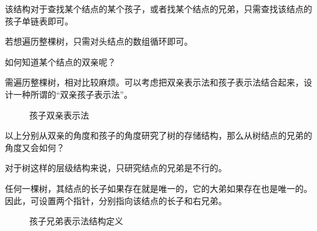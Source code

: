 \begin{frame}
\begin{figure}
\centering

\end{figure}
\end{frame}
%
\begin{frame}

\end{frame}
%
\begin{frame}
该结构对于查找某个结点的某个孩子，或者找某个结点的兄弟，只需查找该结点的孩子单链表即可。\vspace{0.2in}

若想遍历整棵树，只需对头结点的数组循环即可。
\end{frame}
%
\begin{frame}
\begin{wenti}
如何知道某个结点的双亲呢？
\end{wenti}\vspace{0.1in}

\pause
需遍历整棵树，相对比较麻烦。可以考虑把双亲表示法和孩子表示法结合起来，设计一种所谓的“双亲孩子表示法”。
\end{frame}
%
\begin{frame}
\begin{figure}
\centering

\caption{孩子双亲表示法}
\end{figure}
\end{frame}
%
%
%
\begin{frame}
\begin{wenti}
以上分别从双亲的角度和孩子的角度研究了树的存储结构，那么从树结点的兄弟的角度又会如何？
\end{wenti} \pause \vspace{0.1in}

对于树这样的层级结构来说，只研究结点的兄弟是不行的。\pause \vspace{0.1in}

\textcolor{acolor1}{任何一棵树，其结点的长子如果存在就是唯一的，它的大弟如果存在也是唯一的。因此，可设置两个指针，分别指向该结点的长子和右兄弟。}

\end{frame}
%
\begin{frame}
\begin{figure}
\centering

\caption{孩子兄弟表示法结构定义}
\end{figure}
\end{frame}
